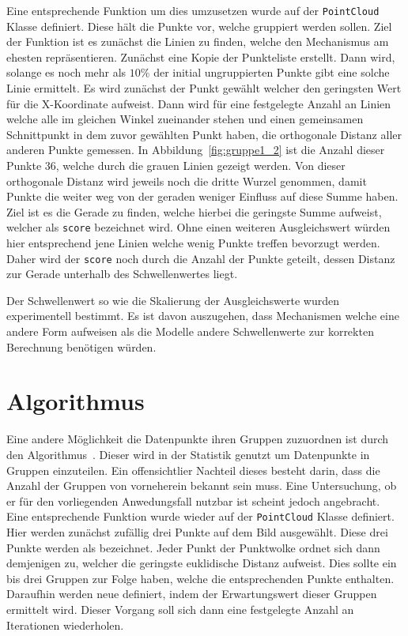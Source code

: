 Eine entsprechende Funktion um dies umzusetzen wurde auf der \lstinline{PointCloud} Klasse definiert.
Diese hält die Punkte vor, welche gruppiert werden sollen.
Ziel der Funktion ist es zunächst die Linien zu finden, welche den Mechanismus am ehesten repräsentieren.
Zunächst eine Kopie der Punkteliste erstellt.
Dann wird, solange es noch mehr als $10\%$ der initial ungruppierten Punkte gibt eine solche Linie ermittelt.
Es wird zunächst der Punkt gewählt welcher den geringsten Wert für die X-Koordinate aufweist.
Dann wird für eine festgelegte Anzahl an Linien welche alle im gleichen Winkel zueinander stehen und einen gemeinsamen Schnittpunkt in dem zuvor gewählten Punkt haben, die orthogonale Distanz aller anderen Punkte gemessen.
In Abbildung~\ref{fig:gruppe1_2} ist die Anzahl dieser Punkte 36, welche durch die grauen Linien gezeigt werden.
Von dieser orthogonale Distanz wird jeweils noch die dritte Wurzel genommen, damit Punkte die weiter weg von der geraden weniger Einfluss auf diese Summe haben.
Ziel ist es die Gerade zu finden, welche hierbei die geringste Summe aufweist, welcher als \lstinline{score} bezeichnet wird.
Ohne einen weiteren Ausgleichswert würden hier entsprechend jene Linien welche wenig Punkte treffen bevorzugt werden.
Daher wird der \lstinline{score} noch durch die Anzahl der Punkte geteilt, dessen Distanz zur Gerade unterhalb des Schwellenwertes liegt.

Der Schwellenwert so wie die Skalierung der Ausgleichswerte wurden experimentell bestimmt.
Es ist davon auszugehen, dass Mechanismen welche eine andere Form aufweisen als die  Modelle andere Schwellenwerte zur korrekten Berechnung benötigen würden.

\section{ Algorithmus}\label{ch:kMeans}

Eine andere Möglichkeit die Datenpunkte ihren Gruppen zuzuordnen ist durch den  Algorithmus~\cite[S.~241]{Geron2019}.
Dieser wird in der Statistik genutzt um Datenpunkte in Gruppen einzuteilen.
Ein offensichtlier Nachteil dieses besteht darin, dass die Anzahl der Gruppen von vorneherein bekannt sein muss.
Eine Untersuchung, ob er für den vorliegenden Anwedungsfall nutzbar ist scheint jedoch angebracht.
Eine entsprechende Funktion wurde wieder auf der \lstinline{PointCloud} Klasse definiert.
Hier werden zunächst zufällig drei Punkte auf dem Bild ausgewählt.
Diese drei Punkte werden als  bezeichnet.
Jeder Punkt der Punktwolke ordnet sich dann demjenigen  zu, welcher die geringste euklidische Distanz aufweist.
Dies sollte ein bis drei Gruppen zur Folge haben, welche die entsprechenden Punkte enthalten.
Daraufhin werden neue  definiert, indem der Erwartungswert dieser Gruppen ermittelt wird.
Dieser Vorgang soll sich dann eine festgelegte Anzahl an Iterationen wiederholen.

